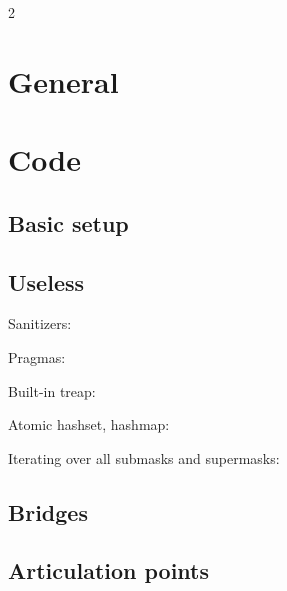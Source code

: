 \documentclass[a4paper]{article}
\begin{document}
\begin{multicols*}{2}

    \tableofcontents

    \section{General}
        
    
    \section{Code}
        
        \subsection{Basic setup}
            

        \subsection{Useless}
            Sanitizers:
                
            
            Pragmas:
                
            
            Built-in treap:
                
                
            Atomic hashset, hashmap:
                
                
            Iterating over all submasks and supermasks:
                
    
        \subsection{Bridges}
            
            
        \subsection{Articulation points}
            
            

\end{multicols*}
\end{document}
